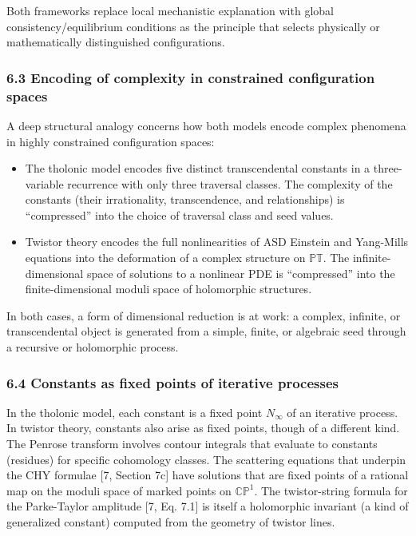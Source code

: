 \documentclass[
  11pt,
  letterpaper,
]{article}
\providecommand{\tightlist}{%
  \setlength{\itemsep}{0pt}\setlength{\parskip}{0pt}}
\begin{document}
Both frameworks replace local mechanistic explanation with global
consistency/equilibrium conditions as the principle that selects
physically or mathematically distinguished configurations.

\subsubsection{6.3 Encoding of complexity in constrained configuration
spaces}\label{encoding-of-complexity-in-constrained-configuration-spaces}

A deep structural analogy concerns how both models encode complex
phenomena in highly constrained configuration spaces:

\begin{itemize}
\tightlist
\item
  The tholonic model encodes five distinct transcendental constants in a
  three-variable recurrence with only three traversal classes. The
  complexity of the constants (their irrationality, transcendence, and
  relationships) is ``compressed'' into the choice of traversal class
  and seed values.
\item
  Twistor theory encodes the full nonlinearities of ASD Einstein and
  Yang-Mills equations into the deformation of a complex structure on
  \(\mathbb{PT}\). The infinite-dimensional space of solutions to a
  nonlinear PDE is ``compressed'' into the finite-dimensional moduli
  space of holomorphic structures.
\end{itemize}

In both cases, a form of dimensional reduction is at work: a complex,
infinite, or transcendental object is generated from a simple, finite,
or algebraic seed through a recursive or holomorphic process.

\subsubsection{6.4 Constants as fixed points of iterative
processes}\label{constants-as-fixed-points-of-iterative-processes}

In the tholonic model, each constant is a fixed point \(N_\infty\) of an
iterative process. In twistor theory, constants also arise as fixed
points, though of a different kind. The Penrose transform involves
contour integrals that evaluate to constants (residues) for specific
cohomology classes. The scattering equations that underpin the CHY
formulae {[}7, Section 7c{]} have solutions that are fixed points of a
rational map on the moduli space of marked points on \(\mathbb{CP}^1\).
The twistor-string formula for the Parke-Taylor amplitude {[}7, Eq.
7.1{]} is itself a holomorphic invariant (a kind of generalized
constant) computed from the geometry of twistor lines.
\end{document}
